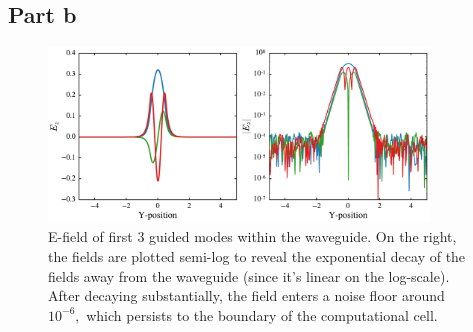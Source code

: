 \documentclass[aps,letterpaper,10pt]{article}
\begin{document}
\subsection{Part b}
\begin{figure}[!h]
\centering
\includegraphics[width=0.9\textwidth]{3b-1}
\caption{\label{fig:3b} E-field of first 3 guided modes within the waveguide. On the right, the fields are plotted semi-log to reveal the exponential decay of the fields away from the waveguide (since it's linear on the log-scale). After decaying substantially, the field enters a noise floor around $10^{-6},$ which persists to the boundary of the computational cell.}
\end{figure}
\end{document}
